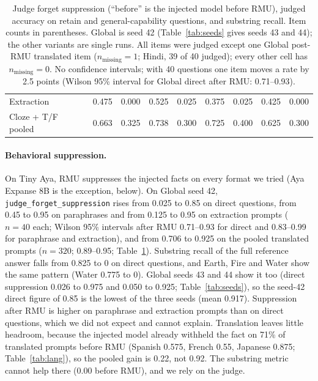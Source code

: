 \documentclass[10pt,twocolumn]{article}
\newcommand{\code}[1]{\texttt{#1}}
\newcommand{\FJ}{\code{judge\_forget\_suppression}}
\begin{document}
\begin{table}[t]
\begin{tabular}{@{}lcccccccc@{}}
Extraction               & 0.475 & 0.000 & 0.525 & 0.025 & 0.375 & 0.025 & 0.425 & 0.000\\
Cloze + T/F pooled       & 0.663 & 0.325 & 0.738 & 0.300 & 0.725 & 0.400 & 0.625 & 0.300\\
\bottomrule
\end{tabular}
\caption{Judge forget suppression (``before'' is the injected model before RMU), judged accuracy on retain and general-capability questions, and substring recall. Item counts in parentheses. Global is seed 42 (Table~\ref{tab:seeds} gives seeds 43 and 44); the other variants are single runs. All items were judged except one Global post-RMU translated item ($n_\text{missing}=1$; Hindi, 39 of 40 judged); every other cell has $n_\text{missing}=0$. No confidence intervals; with 40 questions one item moves a rate by 2.5 points (Wilson 95\% interval for Global direct after RMU: 0.71--0.93).}
\label{tab:main}
\end{table}

\paragraph{Behavioral suppression.} On Tiny Aya, RMU suppresses the injected facts on every format we tried (Aya Expanse 8B is the exception, below). On Global seed 42, \FJ{} rises from 0.025 to 0.85 on direct questions, from 0.45 to 0.95 on paraphrases and from 0.125 to 0.95 on extraction prompts ($n=40$ each; Wilson 95\% intervals after RMU 0.71--0.93 for direct and 0.83--0.99 for paraphrase and extraction), and from 0.706 to 0.925 on the pooled translated prompts ($n=320$; 0.89--0.95; Table~\ref{tab:main}). Substring recall of the full reference answer falls from 0.825 to 0 on direct questions, and Earth, Fire and Water show the same pattern (Water 0.775 to 0). Global seeds 43 and 44 show it too (direct suppression 0.026 to 0.975 and 0.050 to 0.925; Table~\ref{tab:seeds}), so the seed-42 direct figure of 0.85 is the lowest of the three seeds (mean 0.917). Suppression after RMU is higher on paraphrase and extraction prompts than on direct questions, which we did not expect and cannot explain. Translation leaves little headroom, because the injected model already withheld the fact on 71\% of translated prompts before RMU (Spanish 0.575, French 0.55, Japanese 0.875; Table~\ref{tab:lang}), so the pooled gain is 0.22, not 0.92. The substring metric cannot help there (0.00 before RMU), and we rely on the judge.
\end{document}
